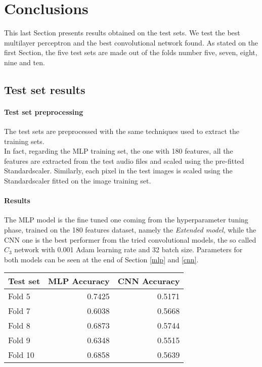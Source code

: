 \section{Conclusions}
\label{results}

This last Section presents results obtained on the test sets. 
We test the best multilayer perceptron and the best convolutional network found.
As stated on the first Section, the five test sets are made out of the 
folds number five, seven, eight, nine and ten.

\subsection{Test set results}

\paragraph{Test set preprocessing}
The test sets are preprocessed with the same techniques used to extract the training sets.\\
In fact, regarding the MLP training set, the one with 180 features, all the features are extracted 
from the test audio files and scaled using the pre-fitted Standardscaler.
Similarly, each pixel in the test images is scaled using the Standardscaler 
fitted on the image training set.

\paragraph{Results}
The MLP model is the fine tuned one coming from the hyperparameter tuning phase, 
trained on the 180 features dataset, namely the \emph{Extended model}, 
while the CNN one is the best performer from the tried convolutional models, 
the so called $C_3$ network with 0.001 Adam learning rate and 32 batch size.
Parameters for both models can be seen at the end of Section \vref{mlp} and \vref{cnn}.
\begin{center}
    \begin{tabular}{ |l|r|r| } 
        \hline
        Test set & MLP Accuracy & CNN Accuracy\\
        \hline
        Fold 5 & 0.7425 & 0.5171\\
        Fold 7 & 0.6038 & 0.5668\\
        Fold 8 & 0.6873 & 0.5744\\
        Fold 9 & 0.6348 & 0.5515\\
        Fold 10 & 0.6858 & 0.5639\\ 
        \hline
    \end{tabular}
\end{center}


